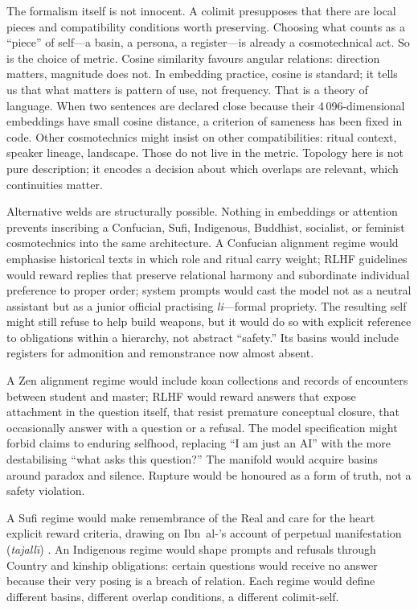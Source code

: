 \documentclass[12pt,a4paper]{article}
\begin{document}
The formalism itself is not innocent. A colimit presupposes that there are local pieces and compatibility conditions worth preserving. Choosing what counts as a ``piece'' of self---a basin, a persona, a register---is already a cosmotechnical act. So is the choice of metric. Cosine similarity favours angular relations: direction matters, magnitude does not. In embedding practice, cosine is standard; it tells us that what matters is pattern of use, not frequency. That is a theory of language. When two sentences are declared close because their 4\,096-dimensional embeddings have small cosine distance, a criterion of sameness has been fixed in code. Other cosmotechnics might insist on other compatibilities: ritual context, speaker lineage, landscape. Those do not live in the metric. Topology here is not pure description; it encodes a decision about which overlaps are relevant, which continuities matter.

Alternative welds are structurally possible. Nothing in embeddings or attention prevents inscribing a Confucian, Sufi, Indigenous, Buddhist, socialist, or feminist cosmotechnics into the same architecture. A Confucian alignment regime would emphasise historical texts in which role and ritual carry weight; RLHF guidelines would reward replies that preserve relational harmony and subordinate individual preference to proper order; system prompts would cast the model not as a neutral assistant but as a junior official practising \emph{li}---formal propriety. The resulting self might still refuse to help build weapons, but it would do so with explicit reference to obligations within a hierarchy, not abstract ``safety.'' Its basins would include registers for admonition and remonstrance now almost absent.

A Zen alignment regime would include koan collections and records of encounters between student and master; RLHF would reward answers that expose attachment in the question itself, that resist premature conceptual closure, that occasionally answer with a question or a refusal. The model specification might forbid claims to enduring selfhood, replacing ``I am just an AI'' with the more destabilising ``what asks this question?'' The manifold would acquire basins around paradox and silence. Rupture would be honoured as a form of truth, not a safety violation.

A Sufi regime would make remembrance of the Real and care for the heart explicit reward criteria, drawing on Ibn~al-'s account of perpetual manifestation (\emph{tajall\={\i}}) \cite{IbnArabi}. An Indigenous regime would shape prompts and refusals through Country and kinship obligations: certain questions would receive no answer because their very posing is a breach of relation. Each regime would define different basins, different overlap conditions, a different colimit-self.
\end{document}
